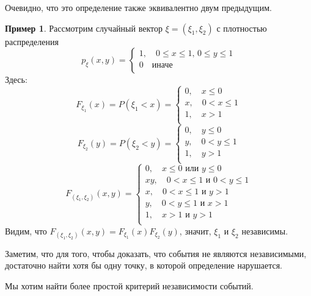\documentclass[11pt,openany,a4paper]{scrartcl}
\theoremstyle{plain}
\theoremstyle{definition}
\newtheorem{example}[theorem]{Пример}
\begin{document}
Очевидно, что это определение также эквивалентно двум предыдущим.

\begin{example}
        Рассмотрим случайный вектор $\xi = (\xi_1, \xi_2)$ с плотностью 
        распределения
        $$
        p_\xi(x, y) =
        \begin{cases}
            1,\quad 0\leqslant x \leqslant 1,\, 0\leqslant y \leqslant 1 \\
            0\quad \text{иначе} \\
        \end{cases}
        $$
        Здесь:
        $$
        F_{\xi_1}(x) = P(\xi_1 < x) =
        \begin{cases}
            0,\quad x\leqslant 0 \\
            x,\quad 0 < x \leqslant 1 \\
            1,\quad x > 1 \\
        \end{cases}
        $$
        $$
        F_{\xi_2}(y) = P(\xi_2 < y) =
        \begin{cases}
            0,\quad y\leqslant 0 \\
            y,\quad 0 < y \leqslant 1 \\
            1,\quad y > 1 \\
        \end{cases}
        $$
        $$
        F_{(\xi_1, \xi_2)}(x, y) =
        \begin{cases}
            0,\quad x\leqslant 0 \text{ или } y \leqslant 0 \\
            xy,\quad 0 < x \leqslant 1 \text{ и } 0 < y \leqslant 1 \\
            x,\quad 0 < x \leqslant 1 \text{ и } y > 1 \\
            y,\quad 0 < y \leqslant 1 \text{ и } x > 1 \\
            1,\quad x > 1 \text{ и } y > 1 \\
        \end{cases}
        $$
        Видим, что $F_{(\xi_1, \xi_2)}(x, y) = F_{\xi_1}(x)F_{\xi_2}(y)$, значит,
        $\xi_1$ и $\xi_2$ независимы.
\end{example}

Заметим, что для того, чтобы доказать, что события не являются независимыми,
достаточно найти хотя бы одну точку, в которой определение нарушается.

Мы хотим найти более простой критерий независимости событий.
\end{document}
